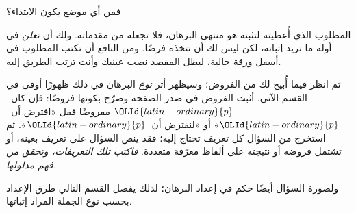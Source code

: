 \documentclass[../../../include/open-logic-section]{subfiles}
\begin{document}


فمن أي موضع يكون الابتداء؟

المطلوب الذي أُعطيته لتثبته هو منتهى البرهان، فلا تجعله من مقدماته.
ولك أن \emph{تعلن} في أوله ما تريد إثباته، لكن ليس لك أن تتخذه
فرضًا. ومن النافع أن تكتب المطلوب في أسفل ورقة خالية، ليظل المقصد
نصب عينيك وأنت ترتب الطريق إليه.

ثم انظر فيما أُبيح لك من الفروض؛ وسيظهر أثر \emph{نوع} البرهان في
ذلك ظهورًا أوفى في القسم الآتي. أثبت الفروض في صدر الصفحة وصرّح
بكونها فروضًا: فإن كان~${\OLId{latin-ordinary}{p}}$ مفروضًا فقل «افترض أن~${\OLId{latin-ordinary}{p}}$» أو «لنفترض
أن~${\OLId{latin-ordinary}{p}}$». ثم استخرج من السؤال كل تعريف تحتاج إليه؛ فقد ينص السؤال على
تعريف بعينه، أو تشتمل فروضه أو نتيجته على ألفاظ معرّفة متعددة.
\emph{فاكتب تلك التعريفات، وتحقق من فهم مدلولها.}

ولصورة السؤال أيضًا حكم في إعداد البرهان؛ لذلك يفصل القسم التالي طرق
الإعداد بحسب نوع الجملة المراد إثباتها.
\end{document}
